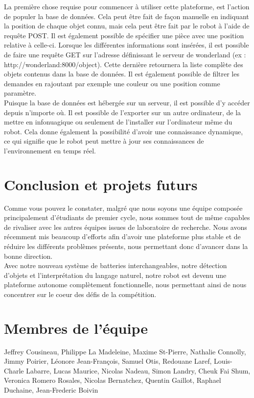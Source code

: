 \documentclass[runningheads,a4paper]{llncs}
\begin{document}
La première chose requise pour commencer à utiliser cette plateforme, est l'action de populer la base de données. Cela peut être fait de façon manuelle en indiquant la position de chaque objet connu, mais cela peut être fait par le robot à l'aide de requête POST. Il est également possible de spécifier une pièce avec une position relative à celle-ci. Lorsque les différentes informations sont insérées, il est possible de faire une requête GET sur l'adresse définissant le serveur de wonderland (ex : http://wonderland:8000/object). Cette dernière retournera la liste complète des objets contenus dans la base de données. Il est également possible de filtrer les demandes en rajoutant par exemple une couleur ou une position comme paramètre. \\

Puisque la base de données est hébergée sur un serveur, il est possible d'y accéder depuis n'importe où. Il est possible de l'exporter sur un autre ordinateur, de la mettre en infonuagique ou seulement de l'installer sur l'ordinateur même du robot. Cela donne également la possibilité d'avoir une connaissance dynamique, ce qui signifie que le robot peut mettre à jour ses connaissances de l'environnement en temps réel.\\



\section{Conclusion et projets futurs} 
Comme vous pouvez le constater, malgré que nous soyons une équipe composée principalement d'étudiants de premier cycle, nous sommes tout de même capables de rivaliser avec les autres équipes issues de laboratoire de recherche. Nous avons récemment mis beaucoup d'efforts afin d'avoir une plateforme plus stable et de réduire les différents problèmes présents, nous permettant donc d'avancer dans la bonne direction. \\

Avec notre nouveau système de batteries interchangeables, notre détection d'objets et l'interprétation du langage naturel, notre robot est devenu une plateforme autonome complètement fonctionnelle, nous permettant ainsi de nous concentrer sur le coeur des défis de la compétition.\\


	

\section*{Membres de l'équipe}
Jeffrey Cousineau, Philippe La Madeleine, Maxime St-Pierre, Nathalie Connolly, Jimmy Poirier, Léonore Jean-François, Samuel Otis, Redouane Laref, Louis-Charle Labarre, Lucas Maurice, Nicolas Nadeau, Simon Landry, Cheuk Fai Shum, Veronica Romero Rosales, Nicolas Bernatchez, Quentin Gaillot, Raphael Duchaine, Jean-Frederic Boivin 

\nocite{*}


\end{document}

